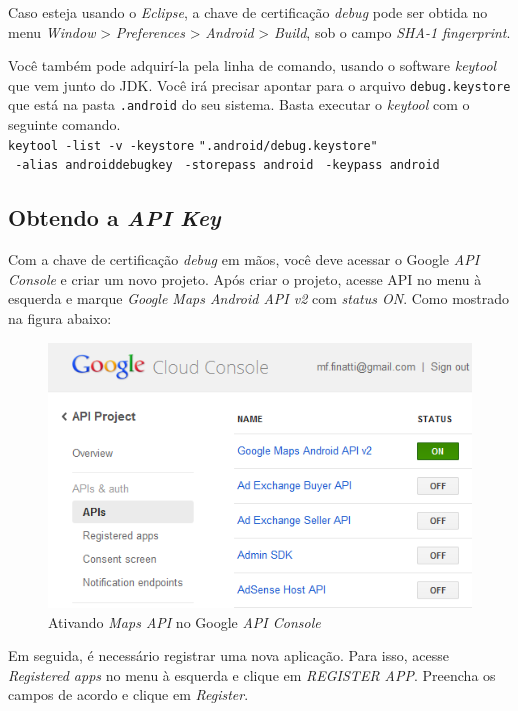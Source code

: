 \documentclass[a4paper,12pt,brazil,oneside]{book}
\begin{document}
\begin{singlespace}
	 	Caso esteja usando o \emph{Eclipse}, a chave de certificação \emph{debug} pode ser obtida no menu \emph{Window} > \emph{Preferences} > \emph{Android}  > \emph{Build}, sob o campo \emph{SHA-1 fingerprint}.

		Você também pode adquirí-la pela linha de comando, usando o software \emph{keytool} que vem junto do JDK. Você irá precisar apontar para o arquivo \texttt{debug.keystore} que está na pasta \texttt{.android} do seu sistema. Basta executar o \emph{keytool} com o seguinte comando. \\

		\texttt{keytool -list -v -keystore} \texttt{".android/debug.keystore"} \\ \texttt{ -alias androiddebugkey} \texttt{ -storepass android} \texttt{ -keypass android}

		\subsection{Obtendo a \emph{API Key}}

		Com a chave de certificação \emph{debug} em mãos, você deve acessar o Google \emph{API Console} e criar um novo projeto. Após criar o projeto, acesse API no menu à esquerda e marque \emph{Google Maps Android API v2} com \emph{status ON}. Como mostrado na figura abaixo:

		\begin{figure}[H]
		  \centering
		  \includegraphics{figuras/api/localizacao/console1.png}
		  \caption{Ativando \emph{Maps API} no Google \emph{API Console}}
		  \label{fig:apiconsole1}
		\end{figure}

		Em seguida, é necessário registrar uma nova aplicação. Para isso, acesse \emph{Registered apps} no menu à esquerda e clique em \emph{REGISTER APP}. Preencha os campos de acordo e clique em \emph{Register}.


\end{singlespace}
\end{document}
